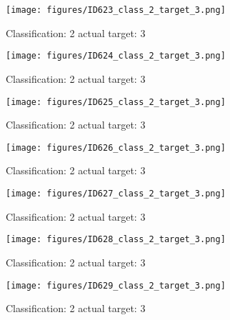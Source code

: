 \begin{figure}[h!]
\begin{center}
\texttt{[image: figures/ID623\_class\_2\_target\_3.png]}
\end{center}
\caption{ Classification: 2 actual target: 3}
\label{fig:ID623_class_2_target_3}
\end{figure}
\begin{figure}[h!]
\begin{center}
\texttt{[image: figures/ID624\_class\_2\_target\_3.png]}
\end{center}
\caption{ Classification: 2 actual target: 3}
\label{fig:ID624_class_2_target_3}
\end{figure}
\begin{figure}[h!]
\begin{center}
\texttt{[image: figures/ID625\_class\_2\_target\_3.png]}
\end{center}
\caption{ Classification: 2 actual target: 3}
\label{fig:ID625_class_2_target_3}
\end{figure}
\begin{figure}[h!]
\begin{center}
\texttt{[image: figures/ID626\_class\_2\_target\_3.png]}
\end{center}
\caption{ Classification: 2 actual target: 3}
\label{fig:ID626_class_2_target_3}
\end{figure}
\begin{figure}[h!]
\begin{center}
\texttt{[image: figures/ID627\_class\_2\_target\_3.png]}
\end{center}
\caption{ Classification: 2 actual target: 3}
\label{fig:ID627_class_2_target_3}
\end{figure}
\begin{figure}[h!]
\begin{center}
\texttt{[image: figures/ID628\_class\_2\_target\_3.png]}
\end{center}
\caption{ Classification: 2 actual target: 3}
\label{fig:ID628_class_2_target_3}
\end{figure}
\begin{figure}[h!]
\begin{center}
\texttt{[image: figures/ID629\_class\_2\_target\_3.png]}
\end{center}
\caption{ Classification: 2 actual target: 3}
\label{fig:ID629_class_2_target_3}
\end{figure}
